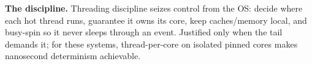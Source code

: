\textbf{The discipline.} Threading discipline seizes control from the OS: decide where each hot thread runs, guarantee it owns its core, keep caches/memory local, and busy-spin so it never sleeps through an event. Justified only when the tail demands it; for these systems, thread-per-core on isolated pinned cores makes nanosecond determinism achievable.
